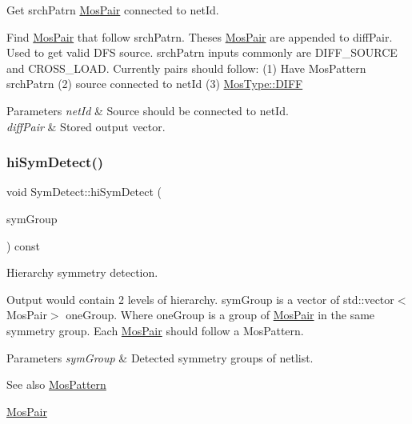 Get srch\+Patrn \hyperlink{structMosPair}{Mos\+Pair} connected to net\+Id. 

Find \hyperlink{structMosPair}{Mos\+Pair} that follow srch\+Patrn. Theses \hyperlink{structMosPair}{Mos\+Pair} are appended to diff\+Pair. Used to get valid D\+FS source. srch\+Patrn inputs commonly are D\+I\+F\+F\+\_\+\+S\+O\+U\+R\+CE and C\+R\+O\+S\+S\+\_\+\+L\+O\+AD. Currently pairs should follow\+: (1) Have Mos\+Pattern srch\+Patrn (2) source connected to net\+Id (3) \hyperlink{type_8h_a34a6a66323cfecf83dfe00bc8fd96333aa2e1ec2dd3d8195d238c5494f0ac5578}{Mos\+Type\+::\+D\+I\+FF}


\begin{DoxyParams}{Parameters}
{\em net\+Id} & Source should be connected to net\+Id. \\
\hline
{\em diff\+Pair} & Stored output vector. \\
\hline
\end{DoxyParams}
\mbox{\label{classSymDetect_a81ec317ab0f508b3e0af483ef8a2c1ac}} 
\subsubsection{\texorpdfstring{hi\+Sym\+Detect()}{hiSymDetect()}}
{\footnotesize\ttfamily void Sym\+Detect\+::hi\+Sym\+Detect (\begin{DoxyParamCaption}\item[{std\+::vector$<$ std\+::vector$<$ \hyperlink{structMosPair}{Mos\+Pair} $>$$>$ \&}]{sym\+Group }\end{DoxyParamCaption}) const}



Hierarchy symmetry detection. 

Output would contain 2 levels of hierarchy. sym\+Group is a vector of std\+::vector$<$\+Mos\+Pair$>$ one\+Group. Where one\+Group is a group of \hyperlink{structMosPair}{Mos\+Pair} in the same symmetry group. Each \hyperlink{structMosPair}{Mos\+Pair} should follow a Mos\+Pattern.


\begin{DoxyParams}{Parameters}
{\em sym\+Group} & Detected symmetry groups of netlist. \\
\hline
\end{DoxyParams}
\begin{DoxySeeAlso}{See also}
\hyperlink{type_8h_af19eddb079bfea723256710b029c38e8}{Mos\+Pattern} 

\hyperlink{structMosPair}{Mos\+Pair} 
\end{DoxySeeAlso}
\mbox{\label{classSymDetect_ae6a1ba27f6768f215cba0623b6e2ce08}} 
